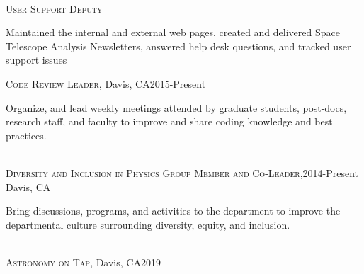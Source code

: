 \documentclass[10pt]{cv}
\begin{document}
\begin{llist}
\\
\textsc{User Support Deputy}\\
\begin{minipage}[l]{0.7\textwidth}\vspace{0.15cm}
Maintained the internal and external web pages, created and delivered Space Telescope Analysis Newsletters, answered help desk questions, and tracked user support issues\\
\end{minipage}\vspace{0.15cm}
\textsc{Code Review Leader}, Davis, CA\hfill 2015-Present\\
\begin{minipage}[l]{0.7\textwidth}\vspace{0.15cm}
Organize, and lead weekly meetings attended by graduate students, post-docs, research staff, and faculty to improve and share coding knowledge and best practices.\\
\end{minipage}\vspace{0.15cm}
\\
\textsc{Diversity and Inclusion in Physics Group Member and Co-Leader,}\hfill 2014-Present\\
Davis, CA \\
\begin{minipage}[l]{0.7\textwidth}\vspace{0.15cm}
Bring discussions, programs, and activities to the department to improve the departmental culture surrounding diversity, equity, and inclusion.\\
\end{minipage}\vspace{0.15cm}
\\
\textsc{Astronomy on Tap}, Davis, CA\hfill 2019\\

\end{llist}
\end{document}
